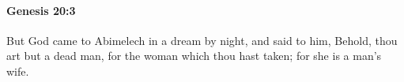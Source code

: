 
		\paragraph{Genesis 20:3} %
			\label{GENESIS-20-3}

			But God came to Abimelech in a dream by night, and said to him, Behold, thou art but a dead man, for the woman which thou hast taken; for she is a man's wife.


